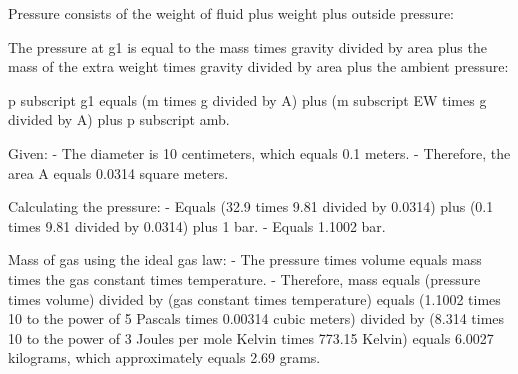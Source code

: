 Pressure consists of the weight of fluid plus weight plus outside pressure:

The pressure at g1 is equal to the mass times gravity divided by area plus the mass of the extra weight times gravity divided by area plus the ambient pressure:

p subscript g1 equals (m times g divided by A) plus (m subscript EW times g divided by A) plus p subscript amb.

Given:
- The diameter is 10 centimeters, which equals 0.1 meters.
- Therefore, the area A equals 0.0314 square meters.

Calculating the pressure:
- Equals (32.9 times 9.81 divided by 0.0314) plus (0.1 times 9.81 divided by 0.0314) plus 1 bar.
- Equals 1.1002 bar.

Mass of gas using the ideal gas law:
- The pressure times volume equals mass times the gas constant times temperature.
- Therefore, mass equals (pressure times volume) divided by (gas constant times temperature) equals (1.1002 times 10 to the power of 5 Pascals times 0.00314 cubic meters) divided by (8.314 times 10 to the power of 3 Joules per mole Kelvin times 773.15 Kelvin) equals 6.0027 kilograms, which approximately equals 2.69 grams.
